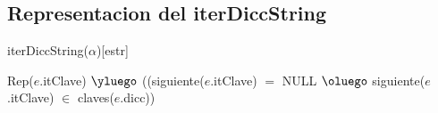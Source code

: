 \begin{Representacion}
\subsection{Representacion del iterDiccString}
    
  \begin{Estructura}{iterDiccString($\alpha$)}[estr]
    \begin{Tupla}[estr]
    \end{Tupla}
  \end{Estructura}




%
{Rep($e$.itClave) $\yluego$ ((siguiente($e$.itClave) $=$ NULL $\oluego$ siguiente($e$.itClave) $\in$ claves($e$.dicc))}

$ $\newline
$ $\newline



%
%

\end{Representacion}

